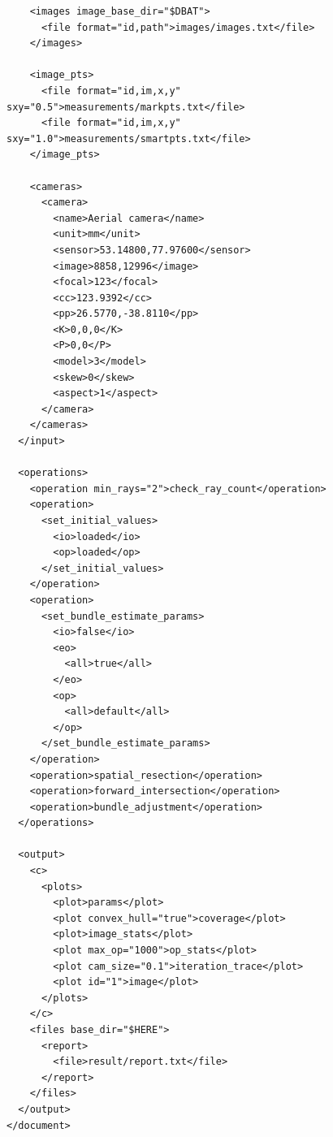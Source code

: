 \documentclass{article}
\begin{document}
\begin{verbatim}
    <images image_base_dir="$DBAT">
      <file format="id,path">images/images.txt</file>
    </images>

    <image_pts>
      <file format="id,im,x,y" sxy="0.5">measurements/markpts.txt</file>
      <file format="id,im,x,y" sxy="1.0">measurements/smartpts.txt</file>
    </image_pts>

    <cameras>
      <camera>
        <name>Aerial camera</name>
        <unit>mm</unit>
        <sensor>53.14800,77.97600</sensor>
        <image>8858,12996</image>
        <focal>123</focal>
        <cc>123.9392</cc>
        <pp>26.5770,-38.8110</pp>
        <K>0,0,0</K>
        <P>0,0</P>
        <model>3</model>
        <skew>0</skew>
        <aspect>1</aspect>
      </camera>
    </cameras>
  </input>

  <operations>
    <operation min_rays="2">check_ray_count</operation>
    <operation>
      <set_initial_values>
        <io>loaded</io>
        <op>loaded</op>
      </set_initial_values>
    </operation>
    <operation>
      <set_bundle_estimate_params>
        <io>false</io>
        <eo>
          <all>true</all>
        </eo>
        <op>
          <all>default</all>
        </op>
      </set_bundle_estimate_params>
    </operation>
    <operation>spatial_resection</operation>
    <operation>forward_intersection</operation>
    <operation>bundle_adjustment</operation>
  </operations>

  <output>
    <c>
      <plots>
        <plot>params</plot>
        <plot convex_hull="true">coverage</plot>
        <plot>image_stats</plot>
        <plot max_op="1000">op_stats</plot>
        <plot cam_size="0.1">iteration_trace</plot>
        <plot id="1">image</plot>
      </plots>
    </c>
    <files base_dir="$HERE">
      <report>
        <file>result/report.txt</file>
      </report>
    </files>
  </output>
</document>
\end{verbatim}
\end{document}
